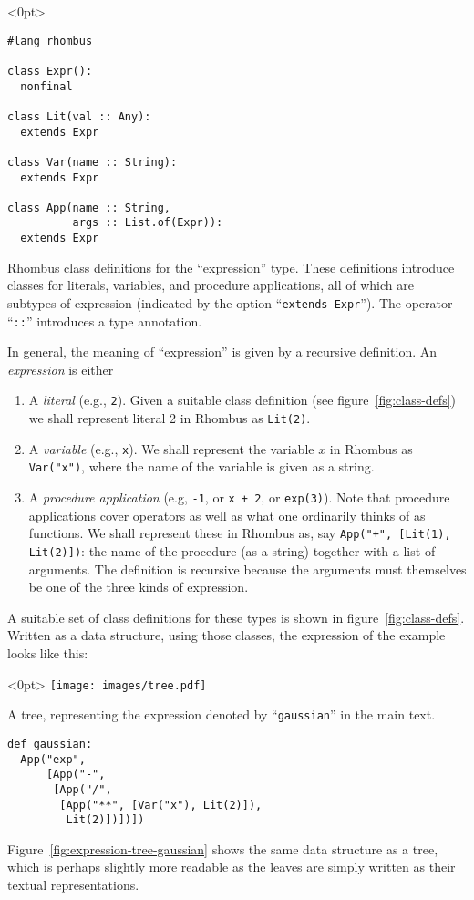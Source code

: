 \documentclass[11pt, a4paper]{article}
\newcommand{\cd}[1]{\texttt{#1}}
\begin{document}
\begin{marginfigure}<0pt>
  \footnotesize
\begin{verbatim}
#lang rhombus

class Expr():
  nonfinal

class Lit(val :: Any):
  extends Expr

class Var(name :: String):
  extends Expr

class App(name :: String,
          args :: List.of(Expr)):
  extends Expr
\end{verbatim}
  \caption{Rhombus class definitions for the ``expression''
    type. These definitions introduce classes for literals, variables,
    and procedure applications, all of which are subtypes of
    expression (indicated by the option ``\cd{extends Expr}''). The
    operator ``\cd{::}'' introduces a type annotation.\label{fig:class-defs}}
\end{marginfigure}
In general, the meaning of ``expression'' is given by a recursive
definition. An \emph{expression} is either
\begin{enumerate}
\item A \emph{literal} (e.g., \cd{2}). Given a suitable class
  definition (see figure~\ref{fig:class-defs}) we shall represent
  literal 2 in Rhombus as \cd{Lit(2)}.
\item A \emph{variable} (e.g., \cd{x}). We shall represent the variable
  $x$ in Rhombus as \cd{Var("x")}, where the name of the variable is
  given as a string.
\item A \emph{procedure application} (e.g, \cd{-1}, or \cd{x + 2}, or
  \cd{exp(3)}). Note that procedure applications cover operators as well
  as what one ordinarily thinks of as functions. We shall represent
  these in Rhombus as, say \cd{App("+", [Lit(1), Lit(2)])}: the name
  of the procedure (as a string) together with a list of
  arguments. The definition is recursive because the arguments must
  themselves be one of the three kinds of expression.
\end{enumerate}

A suitable set of class definitions for these types is shown in
figure~\ref{fig:class-defs}. Written as a data structure, using those
classes, the expression of the example looks like this:
\begin{marginfigure}<0pt>
  \centering
  \texttt{[image: images/tree.pdf]}
  \caption{A tree, representing the expression denoted by
    ``\cd{gaussian}'' in the main text.\label{fig:expression-tree-gaussian}}
\end{marginfigure}
\begin{verbatim}
def gaussian:
  App("exp",
      [App("-",
       [App("/",
        [App("**", [Var("x"), Lit(2)]),
         Lit(2)])])])
\end{verbatim}
Figure~\ref{fig:expression-tree-gaussian} shows the same data
structure as a tree, which is perhaps slightly more
readable as the leaves are simply written as their textual
representations.
\end{document}
